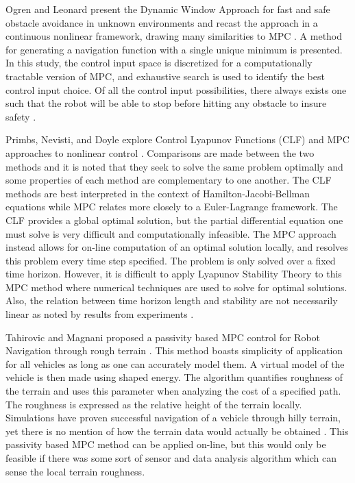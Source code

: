 \documentclass[12pt,onecolumn]{report}
\begin{document}
Ogren and Leonard present the Dynamic Window Approach for fast and safe obstacle avoidance in unknown environments and recast the approach in a continuous nonlinear framework, drawing many similarities to MPC \cite{Ogren&Leonard2005}. A method for generating a navigation function with a single unique minimum is presented. In this study, the control input space is discretized for a computationally tractable version of MPC, and exhaustive search is used to identify the best control input choice. Of all the control input possibilities, there always exists one such that the robot will be able to stop before hitting any obstacle to insure safety \cite{Ogren&Leonard2005}.

Primbs, Nevisti, and Doyle explore Control Lyapunov Functions (CLF) and MPC approaches to nonlinear control \cite{Primbs&Nevistic1999}. Comparisons are made between the two methods and it is noted that they seek to solve the same problem optimally and some properties of each method are complementary to one another. The CLF methods are best interpreted in the context of Hamilton-Jacobi-Bellman equations while MPC relates more closely to a Euler-Lagrange framework. The CLF provides a global optimal solution, but the partial differential equation one must solve is very difficult and computationally infeasible. The MPC approach instead allows for on-line computation of an optimal solution locally, and resolves this problem every time step specified. The problem is only solved over a fixed time horizon. However, it is difficult to apply Lyapunov Stability Theory to this MPC method where numerical techniques are used to solve for optimal solutions. Also, the relation between time horizon length and stability are not necessarily linear as noted by results from experiments \cite{Primbs&Nevistic1999}. 

Tahirovic and Magnani proposed a passivity based MPC control for Robot Navigation through rough terrain \cite{Tahirovic&Magnani2010}. This method boasts simplicity of application for all vehicles as long as one can accurately model them. A virtual model of the vehicle is then made using shaped energy. The algorithm quantifies roughness of the terrain and uses this parameter when analyzing the cost of a specified path. The roughness is expressed as the relative height of the terrain locally. Simulations have proven successful navigation of a vehicle through hilly terrain, yet there is no mention of how the terrain data would actually be obtained \cite{Tahirovic&Magnani2010}. This passivity based MPC method can be applied on-line, but this would only be feasible if there was some sort of sensor and data analysis algorithm which can sense the local terrain roughness.
\end{document}
